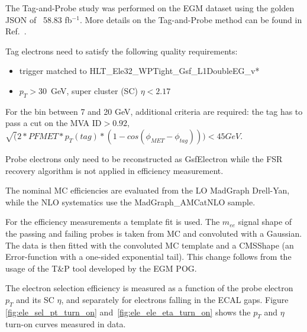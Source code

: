 The Tag-and-Probe study was performed on the EGM dataset using the golden JSON of ~58.83 fb$^{-1}$. More details on the Tag-and-Probe method can be found in Ref.~\cite{AN-15-277}. 

Tag electrons need to satisfy the following quality requirements:
\begin{itemize}
\item trigger matched to HLT\_Ele32\_WPTight\_Gsf\_L1DoubleEG\_v*
\item $p_{T} > 30$~GeV, super cluster (SC) $\eta < 2.17$%
\end{itemize}

For the bin between 7 and 20 GeV, additional criteria are required: the tag has to pass a cut on the MVA ID$>0.92$, $\sqrt(2*PFMET*p_T(tag)*(1-cos(\phi_{MET}-\phi_{tag})))<45 GeV$.

Probe electrons only need to be reconstructed as GsfElectron while the FSR recovery algorithm is not applied in efficiency measurement. 


The nominal MC efficiencies are evaluated from the LO MadGraph Drell-Yan, while the NLO systematics use the MadGraph\_AMCatNLO sample.

For the efficiency measurements a template fit is used. The $m_{ee}$ signal shape of the passing and failing probes is taken from MC and convoluted with a Gaussian. The data is then fitted with the convoluted MC template and a CMSShape (an Error-function with a one-sided exponential tail). This change follows from the usage of the T\&P tool developed by the EGM POG.



The electron selection efficiency is measured as a function of the probe electron $p_{T}$ and its SC $\eta$, and separately for electrons falling in the ECAL gaps. Figure \ref{fig:ele_sel_pt_turn_on} and~\ref{fig:ele_ele_eta_turn_on} shows the $p_{T}$ and $\eta$ turn-on curves measured in data.


